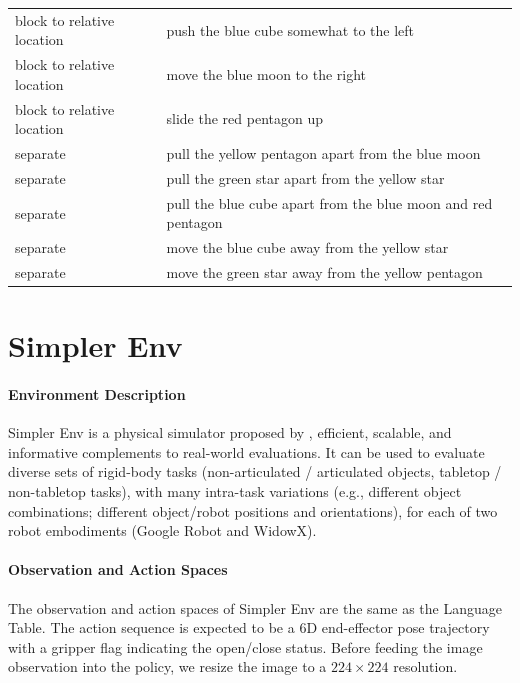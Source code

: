 \begin{table}[t]
\begin{tabular}{@{}ll@{}}
block to relative location & push the blue cube somewhat to the left   \\
block to relative location & move the blue moon to the right   \\
block to relative location & slide the red pentagon up   \\ \midrule
separate            & pull the yellow pentagon apart from the blue moon  \\
separate            & pull the green star apart from the yellow star                   \\
separate            & pull the blue cube apart from the blue moon and red pentagon                 \\
separate            & move the blue cube away from the yellow star       \\
separate            & move the green star away from the yellow pentagon     \\ \bottomrule
\end{tabular}
\end{table}

\section{Simpler Env}

\paragraph{Environment Description} Simpler Env is a physical simulator proposed by \cite{simpler_env}, efficient, scalable, and informative complements to real-world evaluations. It can be used to evaluate diverse sets of rigid-body tasks (non-articulated / articulated objects, tabletop / non-tabletop tasks), with many intra-task variations (e.g., different object combinations; different object/robot positions and orientations), for each of two robot embodiments (Google Robot and WidowX). 

\paragraph{Observation and Action Spaces} The observation and action spaces of Simpler Env are the same as the Language Table. The action sequence is expected to be a 6D end-effector pose trajectory with a gripper flag indicating the open/close status. Before feeding the image observation into the policy, we resize the image to a $224 \times 224$ resolution. 
